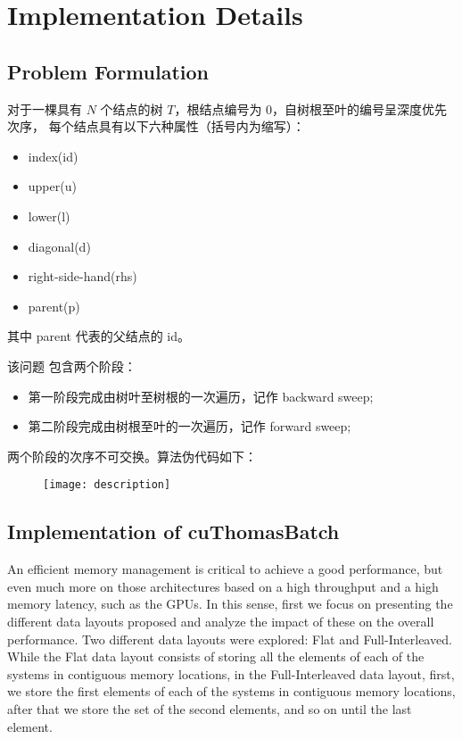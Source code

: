 
\chapter{Implementation Details}

\section{Problem Formulation}

对于一棵具有 $N$ 个结点的树 $T$，根结点编号为 0，自树根至叶的编号呈深度优先次序，
每个结点具有以下六种属性（括号内为缩写）：

\begin{itemize}
    \item index(id)
    \item upper(u)
    \item lower(l)
    \item diagonal(d)
    \item right-side-hand(rhs)
    \item parent(p)  
\end{itemize}

\vspace{1ex}
其中 parent 代表的父结点的 id。

\vspace{5ex}
该问题 包含两个阶段： 

\begin{itemize}
    \item 第一阶段完成由树叶至树根的一次遍历，记作 backward sweep;
    \item 第二阶段完成由树根至叶的一次遍历，记作 forward sweep;
\end{itemize}

\vspace{1ex}
两个阶段的次序不可交换。算法伪代码如下：

\vspace{5ex}
\begin{figure}[htbp]
    \centering
    \texttt{[image: description]}
    \label{fig:description}
\end{figure}


\vspace{10ex}
\section{Implementation of cuThomasBatch}
An efficient memory management is critical to achieve a good performance, but even
much more on those architectures based on a high throughput and a high memory
latency, such as the GPUs. In this sense, first we focus on presenting the different data
layouts proposed and analyze the impact of these on the overall performance. Two
different data layouts were explored: Flat and Full-Interleaved. While the Flat data
layout consists of storing all the elements of each of the systems in contiguous memory
locations, in the Full-Interleaved data layout, first, we store the first elements of each
of the systems in contiguous memory locations, after that we store the set of the second
elements, and so on until the last element.

